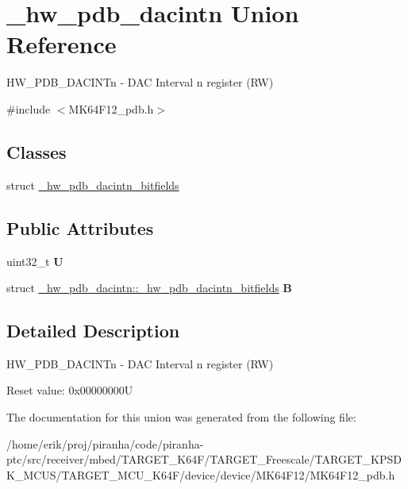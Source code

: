 \hypertarget{union__hw__pdb__dacintn}{}\section{\+\_\+hw\+\_\+pdb\+\_\+dacintn Union Reference}
\label{union__hw__pdb__dacintn}


H\+W\+\_\+\+P\+D\+B\+\_\+\+D\+A\+C\+I\+N\+Tn -\/ D\+AC Interval n register (RW)  




{\ttfamily \#include $<$M\+K64\+F12\+\_\+pdb.\+h$>$}

\subsection*{Classes}
\begin{DoxyCompactItemize}
\item 
struct \hyperlink{struct__hw__pdb__dacintn_1_1__hw__pdb__dacintn__bitfields}{\+\_\+hw\+\_\+pdb\+\_\+dacintn\+\_\+bitfields}
\end{DoxyCompactItemize}
\subsection*{Public Attributes}
\begin{DoxyCompactItemize}
\item 
uint32\+\_\+t {\bfseries U}\hypertarget{union__hw__pdb__dacintn_a4ced5782da9a2a8a910b8e9e3c2bfb91}{}\label{union__hw__pdb__dacintn_a4ced5782da9a2a8a910b8e9e3c2bfb91}

\item 
struct \hyperlink{struct__hw__pdb__dacintn_1_1__hw__pdb__dacintn__bitfields}{\+\_\+hw\+\_\+pdb\+\_\+dacintn\+::\+\_\+hw\+\_\+pdb\+\_\+dacintn\+\_\+bitfields} {\bfseries B}\hypertarget{union__hw__pdb__dacintn_ae0fdc8be8c277e02f27d13d244fda8c5}{}\label{union__hw__pdb__dacintn_ae0fdc8be8c277e02f27d13d244fda8c5}

\end{DoxyCompactItemize}


\subsection{Detailed Description}
H\+W\+\_\+\+P\+D\+B\+\_\+\+D\+A\+C\+I\+N\+Tn -\/ D\+AC Interval n register (RW) 

Reset value\+: 0x00000000U 

The documentation for this union was generated from the following file\+:\begin{DoxyCompactItemize}
\item 
/home/erik/proj/piranha/code/piranha-\/ptc/src/receiver/mbed/\+T\+A\+R\+G\+E\+T\+\_\+\+K64\+F/\+T\+A\+R\+G\+E\+T\+\_\+\+Freescale/\+T\+A\+R\+G\+E\+T\+\_\+\+K\+P\+S\+D\+K\+\_\+\+M\+C\+U\+S/\+T\+A\+R\+G\+E\+T\+\_\+\+M\+C\+U\+\_\+\+K64\+F/device/device/\+M\+K64\+F12/M\+K64\+F12\+\_\+pdb.\+h\end{DoxyCompactItemize}
